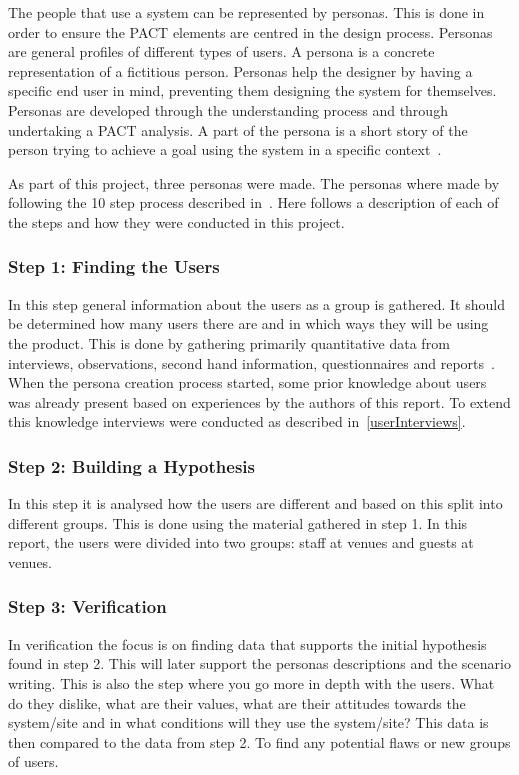 The people that use a system can be represented by personas. This is done in order to ensure the PACT elements are centred in the design process. Personas are general profiles of different types of users. A persona is a concrete representation of a fictitious person. Personas help the designer by having a specific end user in mind, preventing them designing the system for themselves. Personas are developed through the understanding process and through undertaking a PACT analysis. A part of the persona is a short story of the person trying to achieve a goal using the system in a specific context~\cite{benyon2013designing}.

As part of this project, three personas were made. The personas where made by following the 10 step process described in~\cite{nielsen2007persona}. Here follows a description of each of the steps and how they were conducted in this project.

\subsubsection{Step 1: Finding the Users}
In this step general information about the users as a group is gathered. It should be determined how many users there are and in which ways they will be using the product. This is done by gathering primarily quantitative data from interviews, observations, second hand information, questionnaires and reports~\cite{nielsen2007ten}. When the persona creation process started, some prior knowledge about users was already present based on experiences by the authors of this report. To extend this knowledge interviews were conducted as described in~\cref{userInterviews}.

\subsubsection{Step 2: Building a Hypothesis}
In this step it is analysed how the users are different and based on this split into different groups. This is done using the material gathered in step 1. In this report, the users were divided into two groups: staff at venues and guests at venues.

\subsubsection{Step 3: Verification}
In verification the focus is on finding data that supports the initial hypothesis found in step 2. This will later support the personas descriptions and the scenario writing. This is also the step where you go more in depth with the users. What do they dislike, what are their values, what are their attitudes towards the system/site and in what conditions will they use the system/site? This data is then compared to the data from step 2. To find any potential flaws or new groups of users.

